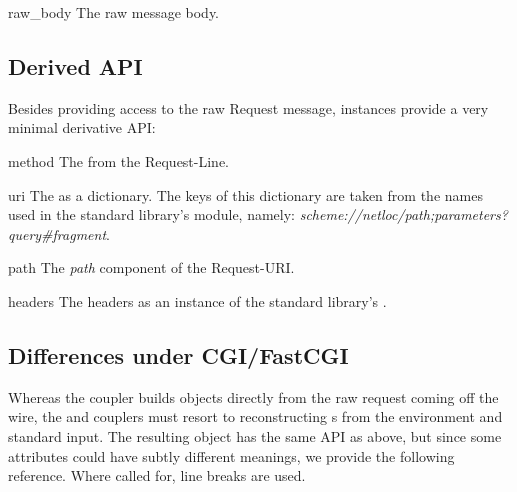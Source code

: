\begin{datadesc}{raw_body}
The raw message body.
\end{datadesc}



\subsection{Derived API}

Besides providing access to the raw Request message,  instances
provide a very minimal derivative API:

\begin{datadesc}{method}
The  from the Request-Line.
\end{datadesc}

\begin{datadesc}{uri}
The  as a dictionary. The keys of this dictionary are taken from the
names used in the standard library's
 module,
namely: \emph{scheme://netloc/path;parameters?query\#fragment}.
\end{datadesc}

\begin{datadesc}{path}
The \emph{path} component of the Request-URI.
\end{datadesc}

\begin{datadesc}{headers}
The headers as an instance of the standard library's
.
\end{datadesc}


\subsection{Differences under CGI/FastCGI}

Whereas the  coupler builds  objects directly
from the raw request coming off the wire, the  and 
couplers must resort to reconstructing s from the environment and
standard input. The resulting object has the same API as above, but since some
attributes could have subtly different meanings, we provide the following
reference. Where called for,  line breaks are used.

